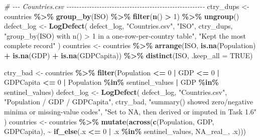 \documentclass[
]{article}
\newenvironment{Shaded}{\begin{snugshade}}{\end{snugshade}}
\newcommand{\AttributeTok}[1]{\textcolor[rgb]{0.13,0.29,0.53}{#1}}
\newcommand{\CommentTok}[1]{\textcolor[rgb]{0.56,0.35,0.01}{\textit{#1}}}
\newcommand{\ConstantTok}[1]{\textcolor[rgb]{0.56,0.35,0.01}{#1}}
\newcommand{\DecValTok}[1]{\textcolor[rgb]{0.00,0.00,0.81}{#1}}
\newcommand{\FunctionTok}[1]{\textcolor[rgb]{0.13,0.29,0.53}{\textbf{#1}}}
\newcommand{\NormalTok}[1]{#1}
\newcommand{\OtherTok}[1]{\textcolor[rgb]{0.56,0.35,0.01}{#1}}
\newcommand{\SpecialCharTok}[1]{\textcolor[rgb]{0.81,0.36,0.00}{\textbf{#1}}}
\newcommand{\StringTok}[1]{\textcolor[rgb]{0.31,0.60,0.02}{#1}}
\begin{document}
\begin{Shaded}
\begin{Highlighting}[]
\CommentTok{\# {-}{-}{-} Countries.csv {-}{-}{-}{-}{-}{-}{-}{-}{-}{-}{-}{-}{-}{-}{-}{-}{-}{-}{-}{-}{-}{-}{-}{-}{-}{-}{-}{-}{-}{-}{-}{-}{-}{-}{-}{-}{-}{-}{-}{-}{-}{-}{-}{-}{-}{-}{-}{-}{-}{-}{-}{-}{-}{-}{-}}
\NormalTok{ctry\_dups }\OtherTok{\textless{}{-}}\NormalTok{ countries }\SpecialCharTok{\%\textgreater{}\%} \FunctionTok{group\_by}\NormalTok{(ISO) }\SpecialCharTok{\%\textgreater{}\%} \FunctionTok{filter}\NormalTok{(}\FunctionTok{n}\NormalTok{() }\SpecialCharTok{\textgreater{}} \DecValTok{1}\NormalTok{) }\SpecialCharTok{\%\textgreater{}\%} \FunctionTok{ungroup}\NormalTok{()}
\NormalTok{defect\_log }\OtherTok{\textless{}{-}} \FunctionTok{LogDefect}\NormalTok{(}
\NormalTok{  defect\_log, }\StringTok{"Countries.csv"}\NormalTok{, }\StringTok{"ISO"}\NormalTok{, ctry\_dups,}
  \StringTok{"group\_by(ISO) with n() \textgreater{} 1 in a one{-}row{-}per{-}country table"}\NormalTok{,}
  \StringTok{"Kept the most complete record"}
\NormalTok{)}
\NormalTok{countries }\OtherTok{\textless{}{-}}\NormalTok{ countries }\SpecialCharTok{\%\textgreater{}\%}
  \FunctionTok{arrange}\NormalTok{(ISO, }\FunctionTok{is.na}\NormalTok{(Population) }\SpecialCharTok{+} \FunctionTok{is.na}\NormalTok{(GDP) }\SpecialCharTok{+} \FunctionTok{is.na}\NormalTok{(GDPCapita)) }\SpecialCharTok{\%\textgreater{}\%}
  \FunctionTok{distinct}\NormalTok{(ISO, }\AttributeTok{.keep\_all =} \ConstantTok{TRUE}\NormalTok{)}

\NormalTok{ctry\_bad }\OtherTok{\textless{}{-}}\NormalTok{ countries }\SpecialCharTok{\%\textgreater{}\%}
  \FunctionTok{filter}\NormalTok{(Population }\SpecialCharTok{\textless{}=} \DecValTok{0} \SpecialCharTok{|}\NormalTok{ GDP }\SpecialCharTok{\textless{}=} \DecValTok{0} \SpecialCharTok{|}\NormalTok{ GDPCapita }\SpecialCharTok{\textless{}=} \DecValTok{0} \SpecialCharTok{|}
\NormalTok{           Population }\SpecialCharTok{\%in\%}\NormalTok{ sentinel\_values }\SpecialCharTok{|}\NormalTok{ GDP }\SpecialCharTok{\%in\%}\NormalTok{ sentinel\_values)}
\NormalTok{defect\_log }\OtherTok{\textless{}{-}} \FunctionTok{LogDefect}\NormalTok{(}
\NormalTok{  defect\_log, }\StringTok{"Countries.csv"}\NormalTok{, }\StringTok{"Population / GDP / GDPCapita"}\NormalTok{, ctry\_bad,}
  \StringTok{"summary() showed zero/negative minima or missing{-}value codes"}\NormalTok{,}
  \StringTok{"Set to NA, then derived or imputed in Task 1.6"}
\NormalTok{)}
\NormalTok{countries }\OtherTok{\textless{}{-}}\NormalTok{ countries }\SpecialCharTok{\%\textgreater{}\%}
  \FunctionTok{mutate}\NormalTok{(}\FunctionTok{across}\NormalTok{(}\FunctionTok{c}\NormalTok{(Population, GDP, GDPCapita),}
                \SpecialCharTok{\textasciitilde{}} \FunctionTok{if\_else}\NormalTok{(.x }\SpecialCharTok{\textless{}=} \DecValTok{0} \SpecialCharTok{|}\NormalTok{ .x }\SpecialCharTok{\%in\%}\NormalTok{ sentinel\_values,}
                          \ConstantTok{NA\_real\_}\NormalTok{, .x)))}


\end{Highlighting}
\end{Shaded}
\end{document}
